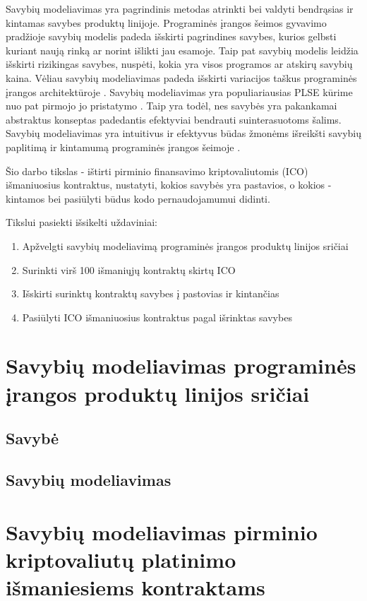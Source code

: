 \documentclass{VUMIFPSkursinis}
\begin{document}
Savybių modeliavimas yra pagrindinis metodas atrinkti bei valdyti bendrąsias ir kintamas savybes produktų linijoje. Programinės įrangos šeimos gyvavimo pradžioje savybių modelis padeda išskirti pagrindines savybes, kurios gelbsti kuriant naują rinką ar  norint išlikti jau esamoje. Taip pat savybių modelis leidžia išskirti rizikingas savybes, nuspėti, kokia yra visos programos ar atskirų savybių kaina. Vėliau savybių modeliavimas padeda išskirti variacijos taškus programinės įrangos architektūroje \cite{Czarnecki2004}. Savybių modeliavimas yra populiariausias PLSE kūrime nuo pat pirmojo jo pristatymo \cite{Kang1990}. Taip yra todėl, nes savybės yra pakankamai abstraktus konseptas padedantis efektyviai bendrauti suinterasuotoms šalims. Savybių modeliavimas yra intuitivus ir efektyvus būdas žmonėms išreikšti savybių paplitimą ir kintamumą programinės įrangos šeimoje \cite{Kang2013}. 

Šio darbo tikslas - ištirti pirminio finansavimo kriptovaliutomis (ICO) išmaniuosius kontraktus, nustatyti, kokios savybės yra pastavios, o kokios - kintamos bei pasiūlyti būdus kodo pernaudojamumui didinti. 

Tikslui pasiekti išsikelti uždaviniai:
\begin{enumerate}
\item Apžvelgti savybių modeliavimą programinės įrangos produktų linijos sričiai 
\item Surinkti virš 100 išmaniųjų kontraktų skirtų ICO
\item Išskirti surinktų kontraktų savybes į pastovias ir kintančias
\item Pasiūlyti ICO išmaniuosius kontraktus pagal išrinktas savybes
\end{enumerate}

\section{Savybių modeliavimas programinės įrangos produktų linijos sričiai}
\subsection{Savybė}
\subsection{Savybių modeliavimas}
\section{Savybių modeliavimas pirminio kriptovaliutų platinimo išmaniesiems kontraktams}
\end{document}
